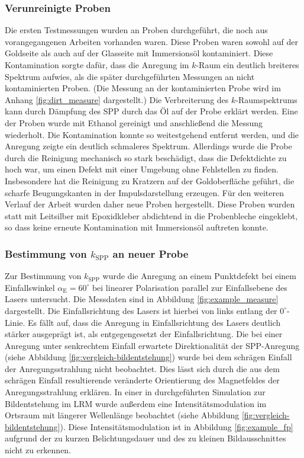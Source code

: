 \documentclass[titlepage,  ngerman]{article}
\begin{document}
	\subsubsection{Verunreinigte Proben}
	Die ersten Testmessungen wurden an Proben durchgeführt, die noch aus vorangegangenen Arbeiten vorhanden waren. Diese Proben waren sowohl auf der Goldseite als auch auf der Glasseite mit Immersionsöl kontaminiert. Diese Kontamination sorgte dafür, dass die Anregung im $k$-Raum ein deutlich breiteres Spektrum aufwies, als die später durchgeführten Messungen an nicht kontaminierten Proben. (Die Messung an der kontaminierten Probe wird im Anhang \ref{fig:dirt_measure} dargestellt.) Die Verbreiterung des $k$-Raumspektrums kann durch Dämpfung des SPP durch das Öl auf der Probe erklärt werden. Eine der Proben wurde mit Ethanol gereinigt und anschließend die Messung wiederholt. Die Kontamination konnte so weitestgehend entfernt werden, und die Anregung zeigte ein deutlich schmaleres Spektrum. Allerdings wurde die Probe durch die Reinigung mechanisch so stark beschädigt, dass die Defektdichte zu hoch war, um einen Defekt mit einer Umgebung ohne Fehlstellen zu finden. Insbesondere hat die Reinigung zu Kratzern auf der Goldoberfläche geführt, die scharfe Beugungskanten in der Impulsdarstellung  erzeugen. Für den weiteren Verlauf der Arbeit wurden daher neue Proben hergestellt. Diese Proben wurden statt mit Leitsilber mit Epoxidkleber abdichtend in die Probenbleche eingeklebt, so dass keine erneute Kontamination mit Immersionsöl auftreten konnte.
	\subsubsection{Bestimmung von  $k_{\mathrm{SPP}}$ an neuer Probe}
	Zur Bestimmung von $k_{\mathrm{SPP}}$ wurde die Anregung an einem Punktdefekt bei einem Einfallswinkel $\alpha_{\mathrm{E}} = 60^\circ$ bei linearer Polarisation parallel zur Einfallsebene des Lasers untersucht. Die Messdaten sind in Abbildung \ref{fig:example_measure} dargestellt. Die Einfallsrichtung des Lasers ist hierbei von links entlang der $0^\circ$-Linie. Es fällt auf, dass die Anregung in Einfallsrichtung des Lasers deutlich stärker ausgeprägt ist, als entgegengesetzt der Einfallsrichtung. Die bei einer Anregung unter senkrechtem Einfall erwartete Direktionalität der SPP-Anregung (siehe Abbildung \ref{fig:vergleich-bildentstehung}) wurde bei dem schrägen Einfall der Anregungsstrahlung nicht beobachtet. Dies lässt sich durch die aus dem schrägen Einfall resultierende veränderte Orientierung des Magnetfeldes der Anregungsstrahlung erklären. In einer in \cite{Hohenau.2011} durchgeführten Simulation zur Bildentstehung im LRM wurde außerdem eine Intensitätsmodulation im Ortsraum mit längerer Wellenlänge beobachtet (siehe Abbildung \ref{fig:vergleich-bildentstehung}). Diese Intensitätsmodulation ist in Abbildung \ref{fig:example_fp} aufgrund der zu kurzen Belichtungsdauer und des zu kleinen Bildausschnittes nicht zu erkennen.
	
\end{document}
